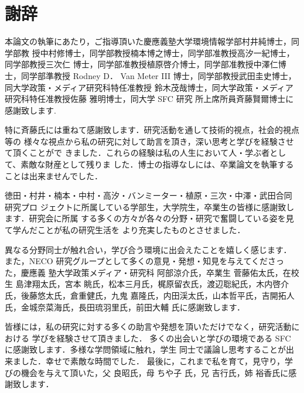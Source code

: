 \chapter*{謝辞}
\label{thanks}

本論文の執筆にあたり，ご指導頂いた慶應義塾大学環境情報学部村井純博士，同学部教
授中村修博士，同学部教授楠本博之博士，同学部准教授高汐一紀博士，同学部教授三次仁
博士，同学部准教授植原啓介博士，同学部准教授中澤仁博士，同学部準教授 Rodney D．
Van Meter III 博士，同学部教授武田圭史博士，同大学政策・メディア研究科特任准教授
鈴木茂哉博士，同大学政策・メディア研究科特任准教授佐藤 雅明博士，同大学 SFC 研究
所上席所員斉藤賢爾博士に感謝致します.

特に斉藤氏には重ねて感謝致します．研究活動を通して技術的視点，社会的視点等の
様々な視点から私の研究に対して助言を頂き，深い思考と学びを経験させて頂くことがで
きました．これらの経験は私の人生において人・学ぶ者として、素敵な財産として残りま
した．博士の指導なしには、卒業論文を執筆することは出来ませんでした．

徳田・村井・楠本・中村・高汐・バンミーター・植原・三次・中澤・武田合同研究プロ
ジェクトに所属している学部生，大学院生，卒業生の皆様に感謝致します．研究会に所属
する多くの方々が各々の分野・研究で奮闘している姿を見て学んだことが私の研究生活を
より充実したものとさせました．

異なる分野同士が触れ合い，学び合う環境に出会えたことを嬉しく感じます．
また，NECO 研究グループとして多くの意見・発想・知見を与えてくださった，慶應義
塾大学政策メディア・研究科 阿部涼介氏，卒業生 菅藤佑太氏，在校生 島津翔太氏，宮本
眺氏，松本三月氏，梶原留衣氏，渡辺聡紀氏，木内啓介氏，後藤悠太氏，倉重健氏，九鬼
嘉隆氏，内田渓太氏，山本哲平氏，吉開拓人氏，金城奈菜海氏，長田琉羽里氏，前田大輔
氏に感謝致します．

皆様には，私の研究に対する多くの助言や発想を頂いただけでなく，研究活動における
学びを経験させて頂きました．
多くの出会いと学びの環境である SFC に感謝致します．多様な学問領域に触れ，学生
同士で議論し思考することが出来ました．幸せで素敵な時間でした．
最後に，これまで私を育て，見守り，学びの機会を与えて頂いた，父 良昭氏，母 ちや子
氏，兄 吉行氏，姉 裕香氏に感謝致します．



